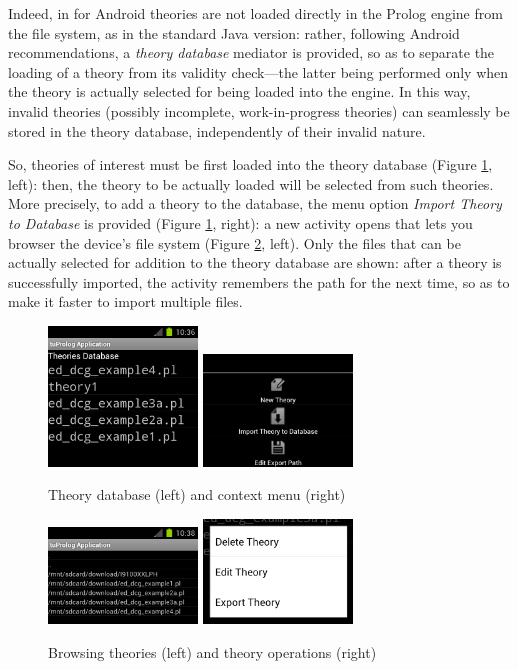 Indeed, in \tuprolog{} for Android theories are not loaded directly in the Prolog engine from the file system, as in the standard Java version: rather, following Android recommendations, a \textit{theory database} mediator is provided, so as to separate the loading of a theory from its validity check---the latter being performed only when the theory is actually selected for being loaded into the engine. In this way, invalid theories (possibly incomplete, work-in-progress theories) can seamlessly be stored in the theory database, independently of their invalid nature.

So, theories of interest must be first loaded into the theory database (Figure \ref{fig:android3e4}, left): then, the theory to be actually loaded will be selected from such theories.
%
More precisely, to add a theory to the database, the menu option \textit{Import Theory to Database} is provided (Figure \ref{fig:android3e4}, right): a new activity opens that lets you browser the device's file system (Figure \ref{fig:android5e6}, left). Only the files that can be actually selected for addition to the theory database are shown: after a theory is successfully imported, the activity remembers the path for the next time, so as to make it faster to import multiple files.

\begin{figure}
\centering
  \includegraphics[width=150px]{images/android3.png}
  \includegraphics[width=150px]{images/android4.png}
  \caption{Theory database (left) and context menu (right)}\label{fig:android3e4}
\end{figure}

\begin{figure}
\centering
  \includegraphics[width=150px]{images/android6.png}
  \includegraphics[width=150px]{images/android5.png}
  \caption{Browsing theories (left) and theory operations (right)}\label{fig:android5e6}
\end{figure}

